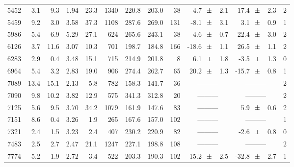 \documentclass{aa}
\begin{document}
\begin{center}
\begin{table}
\begin{center}
\begin{tabular}{crrcrrrrrrlrlc}
5452 & 3.1 & 9.3 & 1.94 & 23.3 & 1340 & 220.8 & 203.0 & 38 & -4.7$\hspace{2.5mm}\pm$ &2.1 & 17.4$\hspace{2.5mm}\pm$ &2.3 & 2 \\
5459 & 9.2 & 3.0 & 3.58 & 37.3 & 1108 & 287.6 & 269.0 & 131 & -8.1$\hspace{2.5mm}\pm$ &3.1 & 3.1$\hspace{2.5mm}\pm$ &0.9 & 1 \\
5986 & 5.4 & 6.9 & 5.29 & 27.1 & 624 & 265.6 & 243.1 & 38 & 4.6$\hspace{2.5mm}\pm$ &0.7 & 22.4$\hspace{2.5mm}\pm$ &3.0 & 2 \\
6126 & 3.7 & 11.6 & 3.07 & 10.3 & 701 & 198.7 & 184.8 & 166 & -18.6$\hspace{2.5mm}\pm$ &1.1 & 26.5$\hspace{2.5mm}\pm$ &1.1 & 2 \\
6283 & 2.9 & 0.4 & 3.48 & 15.1 & 715 & 214.9 & 201.8 & 8 & 6.1$\hspace{2.5mm}\pm$ &1.8 & -3.5$\hspace{2.5mm}\pm$ &1.3 & 0 \\
6964 & 5.4 & 3.2 & 2.83 & 19.0 & 906 & 274.4 & 262.7 & 65 & 20.2$\hspace{2.5mm}\pm$ &1.3 & -15.7$\hspace{2.5mm}\pm$ &0.8 & 1 \\
7089 & 13.4 & 15.1 & 2.13 & 5.8 & 782 & 158.3 & 141.7 & 36 & \multicolumn{2}{c}{---------} & \multicolumn{2}{c}{---------} & 2 \\
7090 & 9.8 & 10.2 & 3.82 & 12.9 & 575 & 341.3 & 312.8 & 20 & \multicolumn{2}{c}{---------} & \multicolumn{2}{c}{---------} & 2 \\
7125 & 5.6 & 9.5 & 3.70 & 34.2 & 1079 & 161.9 & 147.6 & 83 & \multicolumn{2}{c}{---------} & 5.9$\hspace{2.5mm}\pm$ &0.6 & 2 \\
7151 & 8.6 & 0.4 & 3.26 & 1.9 & 265 & 167.6 & 157.0 & 102 & \multicolumn{2}{c}{---------} & \multicolumn{2}{c}{---------} & 1 \\
7321 & 2.4 & 1.5 & 3.23 & 2.4 & 407 & 230.2 & 220.9 & 82 & \multicolumn{2}{c}{---------} & -2.6$\hspace{2.5mm}\pm$ &0.8 & 0 \\
7483 & 2.5 & 2.7 & 2.47 & 21.1 & 1247 & 227.1 & 198.8 & 108 & \multicolumn{2}{c}{---------} & \multicolumn{2}{c}{---------} & 2 \\
7774 & 5.2 & 1.9 & 2.72 & 3.4 & 522 & 203.3 & 190.3 & 102 & 15.2$\hspace{2.5mm}\pm$ &2.5 & -32.8$\hspace{2.5mm}\pm$ &2.7 & 1 \\

\end{tabular}
\end{center}
\end{table}
\end{center}
\end{document}

